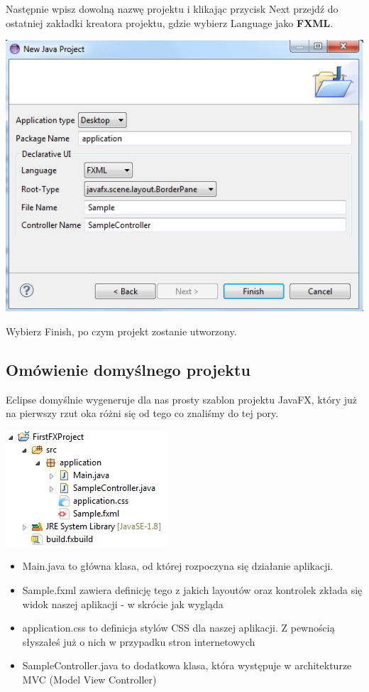 \documentclass[letterpaper,10pt,english]{sphinxmanual}
\begin{document}
Następnie wpisz dowolną nazwę projektu i klikając przycisk Next przejdź do ostatniej zakładki kreatora projektu, gdzie wybierz Language jako \textbf{FXML}.

{\hfill\includegraphics{fx2.png}\hfill}

Wybierz Finish, po czym projekt zostanie utworzony.


\subsection{Omówienie domyślnego projektu}
\label{gui:omowienie-domyslnego-projektu}
Eclipse domyślnie wygeneruje dla nas prosty szablon projektu JavaFX, który już na pierwszy rzut oka różni się od tego co znaliśmy do tej pory.

{\hfill\includegraphics{fxproject.png}\hfill}
\begin{itemize}
\item {} 
Main.java to główna klasa, od której rozpoczyna się działanie aplikacji.

\item {} 
Sample.fxml zawiera definicję tego z jakich layoutów oraz kontrolek zkłada się widok naszej aplikacji - w skrócie jak wygląda

\item {} 
application.css to definicja stylów CSS dla naszej aplikacji. Z pewnością słyszałeś już o nich w przypadku stron internetowych

\item {} 
SampleController.java to dodatkowa klasa, która występuje w architekturze MVC (Model View Controller)

\end{itemize}
\end{document}
